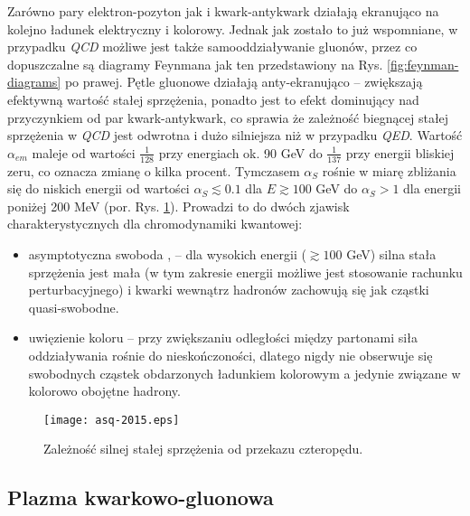 Zarówno pary elektron-pozyton jak i kwark-antykwark działają ekranująco na kolejno ładunek elektryczny i kolorowy. Jednak jak zostało to już wspomniane, w przypadku \textit{QCD} możliwe jest także samooddziaływanie gluonów, przez co dopuszczalne są diagramy Feynmana jak ten przedstawiony na Rys. \ref{fig:feynman-diagrams} po prawej. Pętle gluonowe działają anty-ekranująco -- zwiększają efektywną wartość stałej sprzężenia, ponadto jest to efekt dominujący nad przyczynkiem od par kwark-antykwark, co sprawia że zależność biegnącej stałej sprzężenia w \textit{QCD} jest odwrotna i dużo silniejsza niż w przypadku \textit{QED}. Wartość $\alpha_{em}$ maleje od wartości $\frac{1}{128}$ przy energiach ok. 90 GeV do $\frac{1}{137}$ przy energii bliskiej zeru, co oznacza zmianę o kilka procent. 
Tymczasem $\alpha_S$ rośnie w miarę zbliżania się do niskich energii od wartości $\alpha_S\lesssim 0.1$ dla $E \gtrsim 100$ GeV do $\alpha_S > 1$ dla energii poniżej 200 MeV (por. Rys. \ref{fig:running-coupling-const}). Prowadzi to do dwóch zjawisk charakterystycznych dla chromodynamiki kwantowej: 
\begin{itemize}
	\item asymptotyczna swoboda  \cite{Gross:1973id}, \cite{Politzer:1973fx} -- dla wysokich energii ($\gtrsim 100$ GeV) silna stała sprzężenia jest mała (w tym zakresie energii możliwe jest stosowanie rachunku perturbacyjnego) i kwarki wewnątrz hadronów zachowują się jak cząstki quasi-swobodne.
	\item uwięzienie koloru  -- przy zwiększaniu odległości między partonami siła oddziaływania rośnie do nieskończoności, dlatego nigdy nie obserwuje się swobodnych cząstek obdarzonych ładunkiem kolorowym a jedynie związane w kolorowo obojętne hadrony.
\end{itemize}


\begin{figure}[h]
	\centering
	\texttt{[image: asq-2015.eps]}
	\caption{Zależność silnej stałej sprzężenia od przekazu czteropędu. }
	\label{fig:running-coupling-const}
\end{figure}


\subsection{Plazma kwarkowo-gluonowa}
\label{subsec:qgp}

